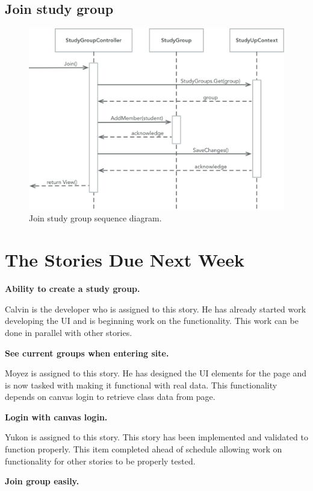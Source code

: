 \documentclass[12pt,letterpaper]{article}
\begin{document}
\subsection{Join study group}
\begin{figure}[!htb]
  \includegraphics[width=\linewidth]{JoinGroupUML.png}
  \caption{Join study group sequence diagram.}
  \label{join_group}
\end{figure}
\clearpage

\section{The Stories Due Next Week}
\textbf{Ability to create a study group.}

Calvin is the developer who is assigned to this story. He has already started work developing the UI and is beginning work on the functionality. This work can be done in parallel with other stories.

\textbf{See current groups when entering site.}

Moyez is assigned to this story. He has designed the UI elements for the page and is now tasked with making it functional with real data. This functionality depends on canvas login to retrieve class data from page.

\textbf{Login with canvas login.}

Yukon is assigned to this story. This story has been implemented and validated to function properly. This item completed ahead of schedule allowing work on functionality for other stories to be properly tested.

\textbf{Join group easily.}
\end{document}
